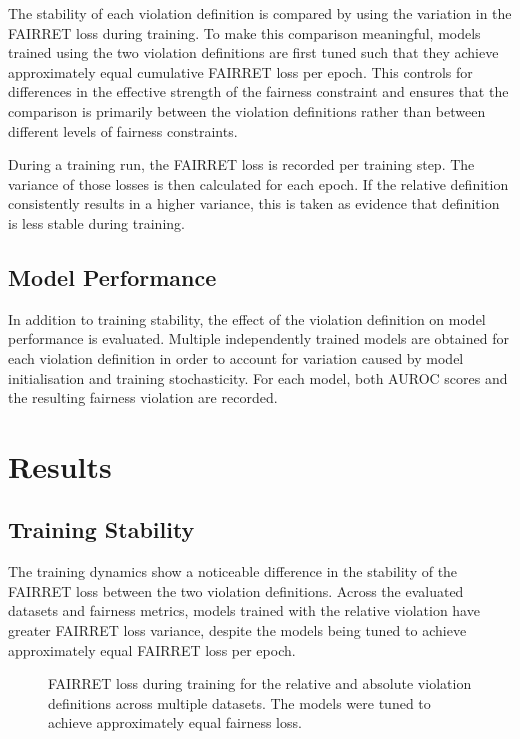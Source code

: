 The stability of each violation definition is compared by using the variation in the FAIRRET loss during training. To make this comparison meaningful, models trained using the two violation definitions are first tuned such that they achieve approximately equal cumulative FAIRRET loss per epoch. This controls for differences in the effective strength of the fairness constraint and ensures that the comparison is primarily between the violation definitions rather than between different levels of fairness constraints.

During a training run, the FAIRRET loss is recorded per training step. The variance of those losses is then calculated for each epoch. If the relative definition consistently results in a higher variance, this is taken as evidence that definition is less stable during training.

\subsection{Model Performance}

In addition to training stability, the effect of the violation definition on model performance is evaluated. Multiple independently trained models are obtained for each violation definition in order to account for variation caused by model initialisation and training stochasticity. For each model, both AUROC scores and the resulting fairness violation are recorded.




\section{Results}

\subsection{Training Stability}

The training dynamics show a noticeable difference in the stability of the FAIRRET loss between the two violation definitions. Across the evaluated datasets and fairness metrics, models trained with the relative violation have greater FAIRRET loss variance, despite the models being tuned to achieve approximately equal FAIRRET loss per epoch.

\begin{figure}[ht]
\centering
\caption{FAIRRET loss during training for the relative and absolute violation definitions across multiple datasets. The models were tuned to achieve approximately equal fairness loss.}
\label{fig}
\end{figure}

